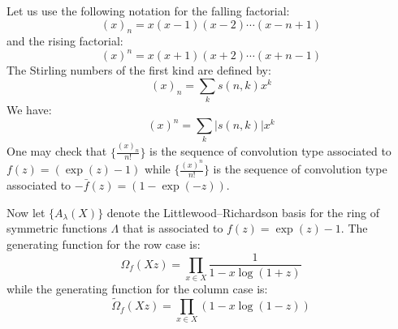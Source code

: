 \documentclass[12pt,dvips]{amsart}
\begin{document}
\par\bigskip
Let us use the following notation for the falling factorial:
$$ (x)_n = x(x-1)(x-2) \cdots (x-n+1)$$
and the rising factorial:
$$ (x)^n = x(x+1)(x+2) \cdots (x+n-1) $$
The Stirling numbers of the first kind are defined by:
$$ (x)_n = \sum_k s(n,k) x^k $$
We have:
$$ (x)^n = \sum_k |s(n,k)| x^k $$
One may check that $\{\frac{(x)_n}{n!}\}$ is the sequence of convolution type associated to $f(z) = (\exp(z) - 1)$ while $\{\frac{(x)^n}{n!}\}$ is the sequence of convolution type associated to $-\bar{f}(z) = (1 - \exp(-z))$.





\bigskip
Now let $\{A_\lambda(X)\}$ denote the Littlewood--Richardson basis for the ring of symmetric functions $\Lambda$ that is associated to $f(z) = \exp(z) - 1$. 
The generating function for the row case is:
$$ \Omega_f(Xz) = \prod_{x \in X} \frac{1}{1 - x \log (1+z)}  $$
while the generating function for the column case is:
$$ \tilde{\Omega}_f(Xz) = \prod_{x \in X} (1 - x \log(1-z)) $$
\end{document}
